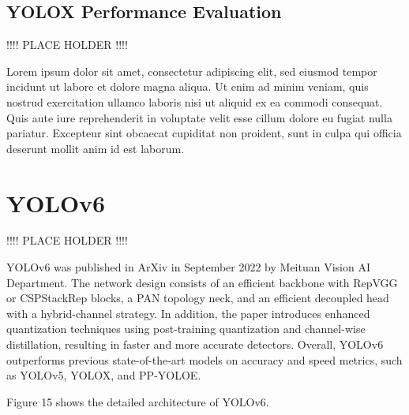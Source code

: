 \documentclass{article}
\begin{document}
\subsection{YOLOX Performance Evaluation}

!!!! PLACE HOLDER !!!!

Lorem ipsum dolor sit amet, consectetur adipiscing elit, sed eiusmod tempor incidunt ut labore et dolore magna aliqua. Ut enim ad minim veniam, quis nostrud exercitation ullamco laboris nisi ut aliquid ex ea commodi consequat. Quis aute iure reprehenderit in voluptate velit esse cillum dolore eu fugiat nulla pariatur. Excepteur sint obcaecat cupiditat non proident, sunt in culpa qui officia deserunt mollit anim id est laborum.



\section{YOLOv6}

!!!! PLACE HOLDER !!!!

YOLOv6 \cite{li2022yolov6} was published in ArXiv in September 2022 by Meituan Vision AI Department. The network design consists of an efficient backbone with RepVGG or CSPStackRep blocks, a PAN topology neck, and an efficient decoupled head with a hybrid-channel strategy. In addition, the paper introduces enhanced quantization techniques using post-training quantization and channel-wise distillation, resulting in faster and more accurate detectors. Overall, YOLOv6 outperforms previous state-of-the-art models on accuracy and speed metrics, such as YOLOv5, YOLOX, and PP-YOLOE.

Figure 15 shows the detailed architecture of YOLOv6.
\end{document}
